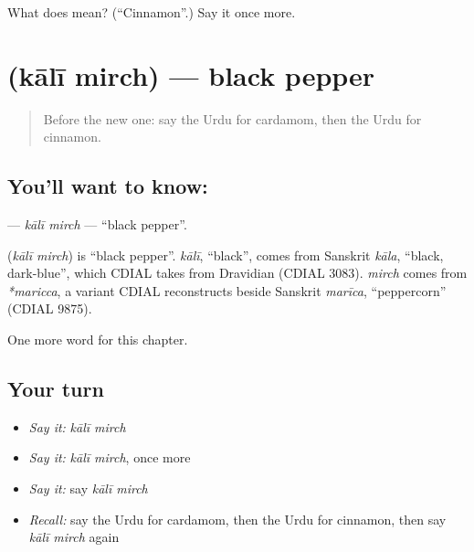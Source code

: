 \begin{tcolorbox}[breakable,colback=teal!4,colframe=teal!35!black,title={Before you move on}]
What does  mean? (\textquotedblleft{}Cinnamon\textquotedblright{}.) Say it once more.
\end{tcolorbox}
\section[\texorpdfstring{\ur{کالی} \ur{مرچ} (kālī mirch)}{کالی مرچ (kālī mirch)}]{  (kālī mirch) — black pepper}

\label{lesson:UR-C207-kali-mirch}



\begin{quote}
Before the new one: say the Urdu for cardamom, then the Urdu for cinnamon.
\end{quote}

\subsection*{You'll want to know:  }
\textbf{ } — \emph{kālī mirch} — \textquotedblleft{}black pepper\textquotedblright{}.

\begin{cousinweb}
\textbf{ } (\emph{kālī mirch}) is \textquotedblleft{}black pepper\textquotedblright{}. \emph{kālī}, \textquotedblleft{}black\textquotedblright{}, comes from Sanskrit \emph{kāla}, \textquotedblleft{}black, dark-blue\textquotedblright{}, which CDIAL takes from Dravidian (CDIAL 3083). \emph{mirch} comes from \emph{*maricca}, a variant CDIAL reconstructs beside Sanskrit \emph{marīca}, \textquotedblleft{}peppercorn\textquotedblright{} (CDIAL 9875).
\end{cousinweb}

\begin{grammarlens}[title={What you've built}]
One more word for this chapter.
\end{grammarlens}

\subsection*{Your turn}
\begin{itemize}
\raggedright
  \item \emph{Say it:} \emph{kālī mirch}
  \item \emph{Say it:} \emph{kālī mirch}, once more
  \item \emph{Say it:} say \emph{kālī mirch}
  \item \emph{Recall:} say the Urdu for cardamom, then the Urdu for cinnamon, then say \emph{kālī mirch} again
\end{itemize}

